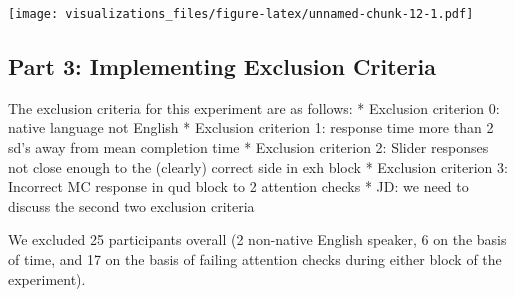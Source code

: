 \documentclass[]{article}
\newenvironment{Shaded}{\begin{snugshade}}{\end{snugshade}}
\newcommand{\KeywordTok}[1]{\textcolor[rgb]{0.13,0.29,0.53}{\textbf{#1}}}
\newcommand{\FloatTok}[1]{\textcolor[rgb]{0.00,0.00,0.81}{#1}}
\newcommand{\StringTok}[1]{\textcolor[rgb]{0.31,0.60,0.02}{#1}}
\newcommand{\CommentTok}[1]{\textcolor[rgb]{0.56,0.35,0.01}{\textit{#1}}}
\newcommand{\OperatorTok}[1]{\textcolor[rgb]{0.81,0.36,0.00}{\textbf{#1}}}
\newcommand{\NormalTok}[1]{#1}
\begin{document}
\texttt{[image: visualizations\_files/figure-latex/unnamed-chunk-12-1.pdf]}

\subsection{Part 3: Implementing Exclusion
Criteria}\label{part-3-implementing-exclusion-criteria}

The exclusion criteria for this experiment are as follows: * Exclusion
criterion 0: native language not English * Exclusion criterion 1:
response time more than 2 sd's away from mean completion time *
Exclusion criterion 2: Slider responses not close enough to the
(clearly) correct side in exh block * Exclusion criterion 3: Incorrect
MC response in qud block to 2 attention checks * JD: we need to discuss
the second two exclusion criteria

We excluded 25 participants overall (2 non-native English speaker, 6 on
the basis of time, and 17 on the basis of failing attention checks
during either block of the experiment).

\begin{Shaded}
\end{Shaded}
\end{document}
